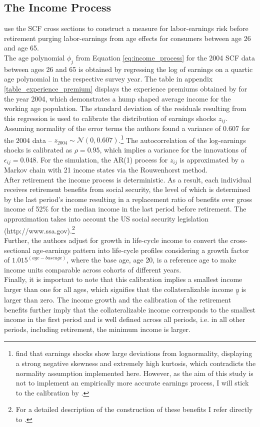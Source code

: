 \documentclass[a4paper,12pt,legno]{article}
\begin{document}
\subsection{The Income Process}
\cite{hintermaier2011} use the SCF cross sections to construct a measure for labor-earnings risk before retirement purging labor-earnings from age effects for consumers between age 26 and age 65.\\ 
The age polynomial $\phi_{j}$ from Equation \ref{eq:income_process} for the 2004 SCF data between ages 26 and 65 is obtained by regressing the log of earnings on a quartic age polynomial in the respective survey year. The table in appendix \ref{table_experience_premium} displays the experience premiums obtained by \cite{hintermaier2011} for the year 2004, which demonstrates a hump shaped average income for the working age population.
The standard deviation of the residuals resulting from this regression is used to calibrate the distribution of earnings shocks $z_{ij}$. Assuming normality of the error terms the authors found a variance of $0.607$ for the 2004 data \---  $z_{2004} \sim \mathcal{N}(0,0.607)$.\footnote{\cite{guvenen2015data} find that earnings shocks show large deviations from lognormality, displaying a strong negative skewness and extremely high kurtosis, which contradicts the normality assumption implemented here. However, as the aim of this study is not to implement an empirically more accurate earnings process, I will stick to the calibration by \cite{hintermaier2011}.} The autocorrelation of the log-earnings shocks is calibrated as $\rho = 0.95$, which implies a variance for the innovations of $\epsilon_{ij} = 0.048$. For the simulation, the AR(1) process for $z_{ij}$ is approximated by a Markov chain with 21 income states via the Rouwenhorst method. \\
After retirement the income process is deterministic. As a result, each individual receives retirement benefits from social security, the level of which is determined by the last period's income resulting in a replacement ratio of benefits over gross income of 52\% for the median income in the last period before retirement. The approximation takes into account the US social security legislation (http://www.ssa.gov).\footnote{For a detailed description of the construction of these benefits I refer directly to \cite{hintermaier2011}.} \\
Further, the authors adjust for growth in life-cycle income to convert the cross-sectional age-earnings pattern into life-cycle profiles considering a growth factor of $1.015^{(age-base age)}$, where the base age, age 20, is a reference age to make income units comparable across cohorts of different years.\\
Finally, it is important to note that this calibration implies a smallest income larger than one for all ages, which signifies that the collateralizable income $\underline{y}$ is larger than zero. The income growth and the calibration of the retirement benefits further imply that the collateralizable income corresponds to the smallest income in the first period and is well defined across all periods, i.e. in all other periods, including retirement, the minimum income is larger. 
\end{document}

